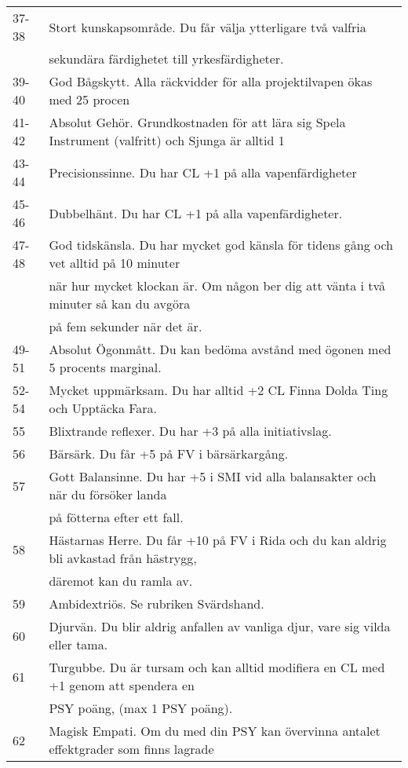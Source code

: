 \documentclass[a4paper, 10pt, titlepage]{article}
\begin{document}
\begin{table}[hbp]
\begin{tabular}{|l|l|}
   37-38     & Stort kunskapsområde. Du får välja ytterligare två valfria  \\
   ~         & sekundära färdighetet till yrkesfärdigheter. \\
   39-40     & God Bågskytt. Alla räckvidder för alla projektilvapen ökas med 25 procen \\
   41-42     & Absolut Gehör. Grundkostnaden för att lära sig Spela Instrument (valfritt) och Sjunga är alltid 1 \\
   43-44     & Precisionssinne. Du har CL +1 på alla vapenfärdigheter \\
   45-46     & Dubbelhänt. Du har CL +1 på alla vapenfärdigheter. \\
   47-48     & God tidskänsla. Du har mycket god känsla för tidens gång och vet alltid på 10 minuter \\
   ~         & när hur mycket klockan är. Om någon ber dig att vänta i två minuter så kan du avgöra  \\
   ~         & på fem sekunder när det är. \\
   49-51     & Absolut Ögonmått. Du kan bedöma avstånd med ögonen med 5 procents marginal. \\
   52-54     & Mycket uppmärksam. Du har alltid +2 CL Finna Dolda Ting och Upptäcka Fara. \\
   55        & Blixtrande reflexer. Du har +3 på alla initiativslag. \\
   56        & Bärsärk. Du får +5 på FV i bärsärkargång. \\
   57        & Gott Balansinne. Du har +5 i SMI vid alla balansakter och när du försöker landa  \\
   ~         & på fötterna efter ett fall. \\
   58        & Hästarnas Herre. Du får +10 på FV i Rida och du kan aldrig bli avkastad från hästrygg,  \\
   ~         & däremot kan du ramla av. \\
   59        & Ambidextriös. Se rubriken Svärdshand. \\
   60        & Djurvän. Du blir aldrig anfallen av vanliga djur, vare sig vilda eller tama. \\
   61        & Turgubbe. Du är tursam och kan alltid modifiera en CL med +1 genom att spendera en  \\
   ~         & PSY poäng, (max 1 PSY poäng). \\
   62        & Magisk Empati. Om du med din PSY kan övervinna antalet effektgrader som finns lagrade \\

\end{tabular}
\end{table}
\end{document}
